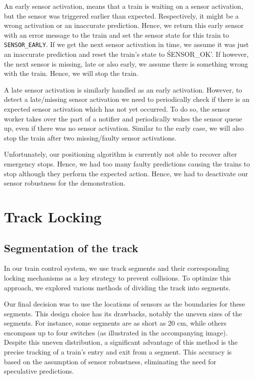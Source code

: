 \documentclass[12pt, titlepage]{article}
\begin{document}
    An early sensor activation, means that a train is waiting on a sensor activation, but the sensor was triggered earlier than expected. 
    Respectively, it might be a wrong activation or an inaccurate prediction. 
    Hence, we return this early sensor with an error message to the train and set the sensor state for this train to \verb'SENSOR_EARLY'.
    If we get the next sensor activation in time, we assume it was just an inaccurate prediction and reset the train's state to \'SENSOR_OK'.
    If however, the next sensor is missing, late or also early, we assume there is something wrong with the train. 
    Hence, we will stop the train. 

    A late sensor activation is similarly handled as an early activation. 
    However, to detect a late/missing sensor activation we need to periodically check if there is an expected sensor activation which has not yet occurred. 
    To do so, the sensor worker takes over the part of a notifier and periodically wakes the sensor queue up, even if there was no sensor activation. 
    Similar to the early case, we will also stop the train after two missing/faulty sensor activations. 

    Unfortunately, our positioning algorithm is currently not able to recover after emergency stops. 
    Hence, we had too many faulty predictions causing the trains to stop although they perform the expected action.
    Hence, we had to deactivate our sensor robustness for the demonstration.

    
    \section{Track Locking}
    \label{sec:locking}
    \subsection{Segmentation of the track}
    In our train control system, we use track segments and their corresponding locking mechanisms as a key strategy to prevent collisions. 
    To optimize this approach, we explored various methods of dividing the track into segments.

    Our final decision was to use the locations of sensors as the boundaries for these segments. 
    This design choice has its drawbacks, notably the uneven sizes of the segments. 
    For instance, some segments are as short as 20 cm, while others encompass up to four switches (as illustrated in the accompanying image). 
    Despite this uneven distribution, a significant advantage of this method is the precise tracking of a train's entry and exit from a segment. 
    This accuracy is based on the assumption of sensor robustness, eliminating the need for speculative predictions.
\end{document}
